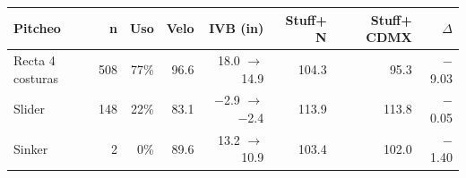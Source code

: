 \begin{tabular}{lrrrrrrr}
\toprule
Pitcheo & n & Uso & Velo & IVB (in) & Stuff+ N & Stuff+ CDMX & $\Delta$ \\
\midrule
Recta 4 costuras & 508 & 77\% & 96.6 & 18.0 $\to$ 14.9 & 104.3 & 95.3 & \ensuremath{-}9.03 \\
Slider & 148 & 22\% & 83.1 & \ensuremath{-}2.9 $\to$ \ensuremath{-}2.4 & 113.9 & 113.8 & \ensuremath{-}0.05 \\
Sinker & 2 & 0\% & 89.6 & 13.2 $\to$ 10.9 & 103.4 & 102.0 & \ensuremath{-}1.40 \\
\bottomrule
\end{tabular}

